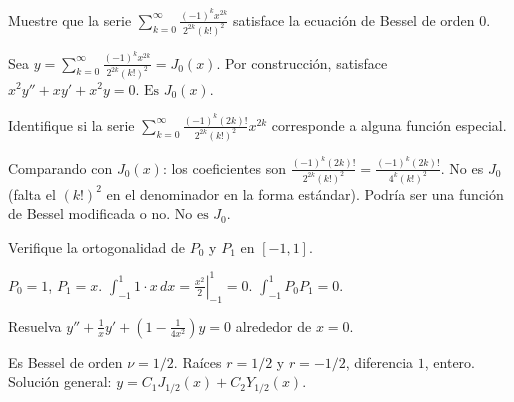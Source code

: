 \begin{prob}
  Muestre que la serie $\sum_{k=0}^{\infty} \frac{(-1)^k x^{2k}}{2^{2k}(k!)^2}$ satisface la ecuación de Bessel de orden $0$.
  \begin{myproof}
    Sea $y=\sum_{k=0}^{\infty} \frac{(-1)^k x^{2k}}{2^{2k}(k!)^2} = J_0(x)$. Por construcción, satisface $x^2 y''+x y'+x^2 y=0$. $\boxed{\text{Es }J_0(x)}$.
  \end{myproof}
\end{prob}

\begin{prob}
  Identifique si la serie $\sum_{k=0}^{\infty} \frac{(-1)^k (2k)!}{2^{2k}(k!)^2} x^{2k}$ corresponde a alguna función especial.
  \begin{myproof}
    Comparando con $J_0(x)$: los coeficientes son $\frac{(-1)^k (2k)!}{2^{2k}(k!)^2} = \frac{(-1)^k (2k)!}{4^k (k!)^2}$. No es $J_0$ (falta el $(k!)^2$ en el denominador en la forma estándar). Podría ser una función de Bessel modificada o no. $\boxed{\text{No es }J_0}$.
  \end{myproof}
\end{prob}

\begin{prob}
  Verifique la ortogonalidad de $P_0$ y $P_1$ en $[-1,1]$.
  \begin{myproof}
    $P_0=1$, $P_1=x$. $\int_{-1}^{1} 1\cdot x\,dx = \left.\frac{x^2}{2}\right|_{-1}^{1}=0$. $\boxed{\int_{-1}^{1} P_0 P_1=0}$.
  \end{myproof}
\end{prob}

\begin{prob}
  Resuelva $y'' + \frac{1}{x} y' + \left(1-\frac{1}{4x^2}\right)y=0$ alrededor de $x=0$.
  \begin{myproof}
    Es Bessel de orden $\nu=1/2$. Raíces $r=1/2$ y $r=-1/2$, diferencia $1$, entero. Solución general: $\boxed{y=C_1 J_{1/2}(x)+C_2 Y_{1/2}(x)}$.
  \end{myproof}
\end{prob}

